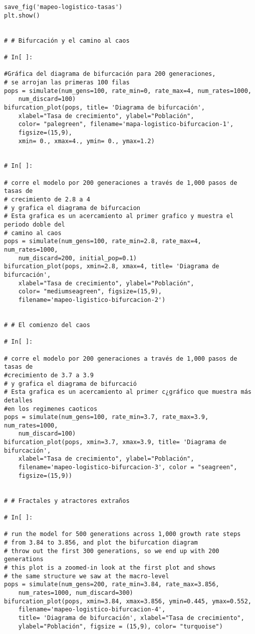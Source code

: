 \begin{verbatim}
save_fig('mapeo-logistico-tasas')
plt.show()


# # Bifurcación y el camino al caos

# In[ ]:

#Gráfica del diagrama de bifurcación para 200 generaciones, 
# se arrojan las primeras 100 filas
pops = simulate(num_gens=100, rate_min=0, rate_max=4, num_rates=1000, 
	num_discard=100)
bifurcation_plot(pops, title= 'Diagrama de bifurcación', 
	xlabel="Tasa de crecimiento", ylabel="Población",
	color= "palegreen", filename='mapa-logistico-bifurcacion-1',
    figsize=(15,9),
    xmin= 0., xmax=4., ymin= 0., ymax=1.2)


# In[ ]:

# corre el modelo por 200 generaciones a través de 1,000 pasos de tasas de 
# crecimiento de 2.8 a 4
# y grafica el diagrama de bifurcacion
# Esta grafica es un acercamiento al primer grafico y muestra el periodo doble del 
# camino al caos 
pops = simulate(num_gens=100, rate_min=2.8, rate_max=4, num_rates=1000,
	num_discard=200, initial_pop=0.1)
bifurcation_plot(pops, xmin=2.8, xmax=4, title= 'Diagrama de bifurcación',
	xlabel="Tasa de crecimiento", ylabel="Población",
    color= "mediumseagreen", figsize=(15,9), 
    filename='mapeo-ligistico-bifurcacion-2')


# # El comienzo del caos

# In[ ]:

# corre el modelo por 200 generaciones a través de 1,000 pasos de tasas de 
#crecimiento de 3.7 a 3.9 
# y grafica el diagrama de bifurcació
# Esta grafica es un acercamiento al primer c¿gráfico que muestra más detalles 
#en los regimenes caoticos
pops = simulate(num_gens=100, rate_min=3.7, rate_max=3.9, num_rates=1000,
	num_discard=100)
bifurcation_plot(pops, xmin=3.7, xmax=3.9, title= 'Diagrama de bifurcación', 
	xlabel="Tasa de crecimiento", ylabel="Población",
    filename='mapeo-logistico-bifurcacion-3', color = "seagreen", 
    figsize=(15,9))


# # Fractales y atractores extraños

# In[ ]:

# run the model for 500 generations across 1,000 growth rate steps 
# from 3.84 to 3.856, and plot the bifurcation diagram
# throw out the first 300 generations, so we end up with 200 generations
# this plot is a zoomed-in look at the first plot and shows 
# the same structure we saw at the macro-level
pops = simulate(num_gens=200, rate_min=3.84, rate_max=3.856, 
	num_rates=1000, num_discard=300)
bifurcation_plot(pops, xmin=3.84, xmax=3.856, ymin=0.445, ymax=0.552,
	filename='mapeo-logistico-bifurcacion-4',
    title= 'Diagrama de bifurcación', xlabel="Tasa de crecimiento",
    ylabel="Población", figsize = (15,9), color= "turquoise")



\end{verbatim}
